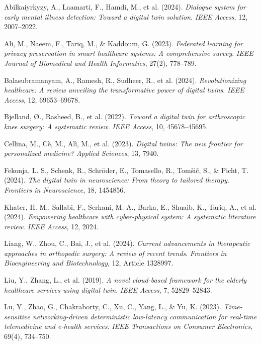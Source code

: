 \documentclass[10pt,a4paper]{article}
\begin{document}
\begin{thebibliography}{99}
\normalsize
\setlength{\itemsep}{0.4em}

Abilkaiyrkyzy, A., Laamarti, F., Hamdi, M., et al. (2024).  
\textit{Dialogue system for early mental illness detection: Toward a digital twin solution}.  
\textit{IEEE Access}, 12, 2007--2022.

Ali, M., Naeem, F., Tariq, M., \& Kaddoum, G. (2023).  
\textit{Federated learning for privacy preservation in smart healthcare systems: A comprehensive survey}.  
\textit{IEEE Journal of Biomedical and Health Informatics}, 27(2), 778--789.

Balasubramanyam, A., Ramesh, R., Sudheer, R., et al. (2024).  
\textit{Revolutionizing healthcare: A review unveiling the transformative power of digital twins}.  
\textit{IEEE Access}, 12, 69653--69678.

Bjelland, Ø., Rasheed, B., et al. (2022).  
\textit{Toward a digital twin for arthroscopic knee surgery: A systematic review}.  
\textit{IEEE Access}, 10, 45678--45695.

Cellina, M., Cè, M., Alì, M., et al. (2023).  
\textit{Digital twins: The new frontier for personalized medicine?}  
\textit{Applied Sciences}, 13, 7940.

Fekonja, L. S., Schenk, R., Schröder, E., Tomasello, R., Tomšič, S., \& Picht, T. (2024).  
\textit{The digital twin in neuroscience: From theory to tailored therapy}.  
\textit{Frontiers in Neuroscience}, 18, 1454856.

Khater, H. M., Sallabi, F., Serhani, M. A., Barka, E., Shuaib, K., Tariq, A., et al. (2024).  
\textit{Empowering healthcare with cyber-physical system: A systematic literature review}.  
\textit{IEEE Access}, 12, 2024.

Liang, W., Zhou, C., Bai, J., et al. (2024).  
\textit{Current advancements in therapeutic approaches in orthopedic surgery: A review of recent trends}.  
\textit{Frontiers in Bioengineering and Biotechnology}, 12, Article 1328997.

Liu, Y., Zhang, L., et al. (2019).  
\textit{A novel cloud-based framework for the elderly healthcare services using digital twin}.  
\textit{IEEE Access}, 7, 52829--52843.

Lu, Y., Zhao, G., Chakraborty, C., Xu, C., Yang, L., \& Yu, K. (2023).  
\textit{Time-sensitive networking-driven deterministic low-latency communication for real-time telemedicine and e-health services}.  
\textit{IEEE Transactions on Consumer Electronics}, 69(4), 734--750.


\end{thebibliography}
\end{document}
